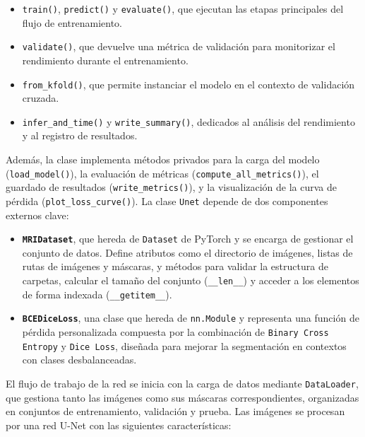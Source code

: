 \documentclass[../main.tex]{subfiles}
\begin{document}
\begin{itemize}
    \item \texttt{train()}, \texttt{predict()} y \texttt{evaluate()}, que ejecutan las etapas principales del flujo de entrenamiento.

    \item \texttt{validate()}, que devuelve una métrica de validación para monitorizar el rendimiento durante el entrenamiento.

    \item \texttt{from\_kfold()}, que permite instanciar el modelo en el contexto de validación cruzada.

    \item \texttt{infer\_and\_time()} y \texttt{write\_summary()}, dedicados al análisis del rendimiento y al registro de resultados.

\end{itemize}
    
Además, la clase implementa métodos privados para la carga del modelo (\texttt{load\_model()}), la evaluación de métricas (\texttt{compute\_all\_metrics()}), el guardado de resultados (\texttt{write\_metrics()}), y la visualización de la curva de pérdida (\texttt{plot\_loss\_curve()}). La clase \texttt{Unet} depende de dos componentes externos clave:

\begin{itemize}
    \item \textbf{\texttt{MRIDataset}}, que hereda de \texttt{Dataset} de PyTorch y se encarga de gestionar el conjunto de datos. Define atributos como el directorio de imágenes, listas de rutas de imágenes y máscaras, y métodos para validar la estructura de carpetas, calcular el tamaño del conjunto (\texttt{\_\_len\_\_}) y acceder a los elementos de forma indexada (\texttt{\_\_getitem\_\_}).

    \item \textbf{\texttt{BCEDiceLoss}}, una clase que hereda de \texttt{nn.Module} y representa una función de pérdida personalizada compuesta por la combinación de \texttt{Binary Cross Entropy} y \texttt{Dice Loss}, diseñada para mejorar la segmentación en contextos con clases desbalanceadas.
\end{itemize}

El flujo de trabajo de la red se inicia con la carga de datos mediante \texttt{DataLoader}, que gestiona tanto las imágenes como sus máscaras correspondientes, organizadas en conjuntos de entrenamiento, validación y prueba. Las imágenes se procesan por una red U-Net con las siguientes características:
\end{document}
